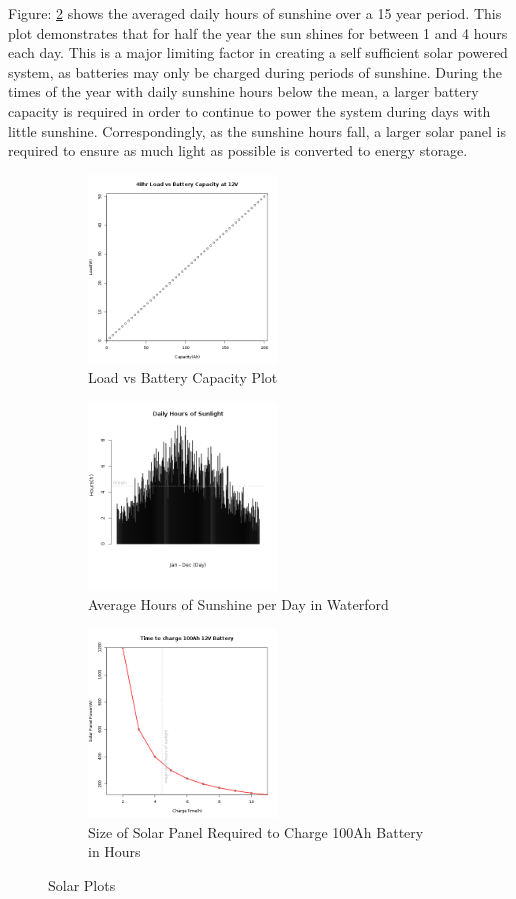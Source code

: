 

Figure: \ref{fig:barplot_hours_sunshine_waterford} shows the averaged daily hours of sunshine over a 15 year period. This plot demonstrates that for half the year the sun shines for between 1 and 4 hours each day. This is a major limiting factor in creating a self sufficient solar powered system, as batteries may only be charged during periods of sunshine. During the times of the year with daily sunshine hours below the mean, a larger battery capacity is required in order to continue to power the system during days with little sunshine. Correspondingly, as the sunshine hours fall, a larger solar panel is required to ensure as much light as possible is converted to energy storage.

%
\begin{figure}	
	\centering
	\begin{subfigure}[t]{5cm}
		\centering
		\includegraphics[width=5cm]{images/64}
		\caption{Load vs Battery Capacity Plot}
		\label{fig:lineplot_load_battery_capacity}		
	\end{subfigure}
	\quad
	\begin{subfigure}[t]{5cm}
		\centering
		\includegraphics[width=5cm]{images/66}
		\caption{Average Hours of Sunshine per Day in Waterford}
		\label{fig:barplot_hours_sunshine_waterford}
	\end{subfigure}
	\quad
	\begin{subfigure}[t]{5cm}
		\centering
		\includegraphics[width=5cm]{images/65}
		\caption{Size of Solar Panel Required to Charge 100Ah Battery in Hours}
		\label{fig:lineplot_solar_panel_battery_capacity_hours}
	\end{subfigure}
	\caption{Solar Plots}
	\label{fig:solar_plots}
\end{figure}
%


